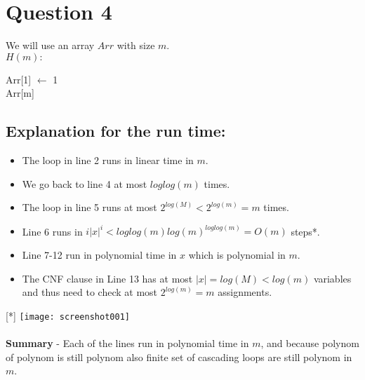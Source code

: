 \documentclass[11pt]{article}
\theoremstyle{plain}
\theoremstyle{nonumberplainnobrackets}
\begin{document}
\section*{Question 4}
We will use an array $Arr$ with size $m$.\\

$H(m):$\\
\begin{algorithm}[H]
	
	Arr[1] $\leftarrow$ 1\\
	\Return Arr[m]
\end{algorithm}
\subsection*{Explanation for the run time:}
\begin{itemize}
\item The loop in line 2 runs in linear time in $m$.
\item We go back to line 4 at most $loglog(m)$ times.
\item The loop in line 5 runs at most $2^{log(M)}<2^{log(m)} = m$ times.
\item Line 6 runs in $i|x|^i < loglog(m)log(m)^{loglog(m)}=O(m)$ steps*.
\item Line 7-12 run in polynomial time in $x$ which is polynomial in $m$. 
\item The CNF clause in Line 13  has at most $|x| = log(M) < log(m)$ variables and thus need to check at most $2^{log(m)} = m$ assignments.
\end{itemize}
[*] \texttt{[image: screenshot001]}\\ \\
\textbf{Summary} - Each of the lines run in polynomial time in $m$, and because polynom of polynom is still polynom also finite set of cascading loops are still polynom in $m$.
\end{document}
